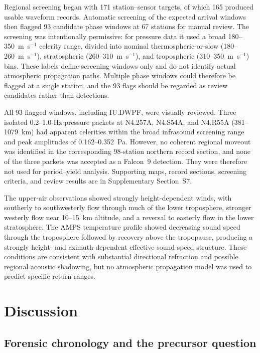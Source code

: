 \documentclass[]{seismica}
\begin{document}
Regional screening began with 171 station--sensor targets, of which 165
produced usable waveform records. Automatic screening of the expected arrival
windows then flagged 93 candidate phase windows at 67 stations for manual
review. The screening was intentionally permissive: for pressure data it used
a broad 180--350~m~s$^{-1}$ celerity range, divided into nominal
thermospheric-or-slow (180--260~m~s$^{-1}$), stratospheric
(260--310~m~s$^{-1}$), and tropospheric (310--350~m~s$^{-1}$) bins. These
labels define screening windows only and do not identify actual atmospheric
propagation paths. Multiple phase windows could therefore be flagged at a
single station, and the 93 flags should be regarded as review candidates
rather than detections.

All 93 flagged windows, including IU.DWPF, were visually reviewed. Three
isolated 0.2--1.0-Hz pressure packets at N4.257A, N4.S54A, and N4.R55A
(381--1079~km) had apparent celerities within the broad infrasound screening
range and peak amplitudes of 0.162--0.352~Pa. However, no coherent regional
moveout was identified in the corresponding 98-station northern record
section, and none of the three packets was accepted as a Falcon~9 detection.
They were therefore not used for period--yield analysis. Supporting maps,
record sections, screening criteria, and review results are in Supplementary
Section~S7.

The upper-air observations showed strongly height-dependent winds, with
southerly to southwesterly flow through much of the lower troposphere, stronger
westerly flow near 10--15~km altitude, and a reversal to easterly flow in the
lower stratosphere. The AMPS temperature profile showed decreasing sound speed
through the troposphere followed by recovery above the tropopause, producing a
strongly height- and azimuth-dependent effective sound-speed structure. These
conditions are consistent with substantial directional refraction and possible
regional acoustic shadowing, but no atmospheric propagation model was used to
predict specific return ranges.


\section{Discussion}
\label{sec:discussion}

\subsection{Forensic chronology and the precursor question}
\end{document}

